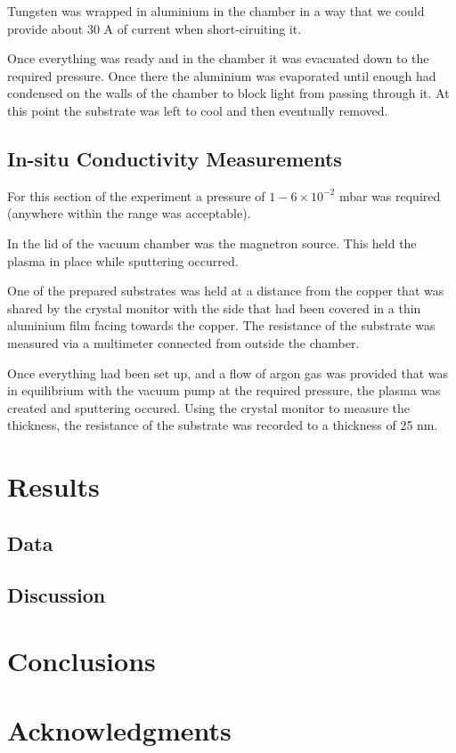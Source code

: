 \documentclass[aps,prl,twocolumn,groupedaddress,showkeys]{revtex4}
\begin{document}
Tungsten was wrapped in aluminium in the chamber in a way that we could provide about 30 A of current when short-ciruiting it.

Once everything was ready and in the chamber it was evacuated down to the required pressure. Once there the aluminium was evaporated until enough had condensed on the walls of the chamber to block light from passing through it. At this point the substrate was left to cool and then eventually removed.


\subsection{In-situ Conductivity Measurements}

For this section of the experiment a pressure of $1-6\times10^{-2}$ mbar was required (anywhere within the range was acceptable).

In the lid of the vacuum chamber was the magnetron source. This held the plasma in place while sputtering occurred.

One of the prepared substrates was held at a distance from the copper that was shared by the crystal monitor with the side that had been covered in a thin aluminium film facing towards the copper. The resistance of the substrate was measured via a multimeter connected from outside the chamber.

Once everything had been set up, and a flow of argon gas was provided that was in equilibrium with the vacuum pump at the required pressure, the plasma was created and sputtering occured. Using the crystal monitor to measure the thickness, the resistance of the substrate was recorded to a thickness of 25 nm.


\section{Results}

\subsection{Data}

\subsection{Discussion}

\section{Conclusions}

\section{Acknowledgments}
\end{document}
